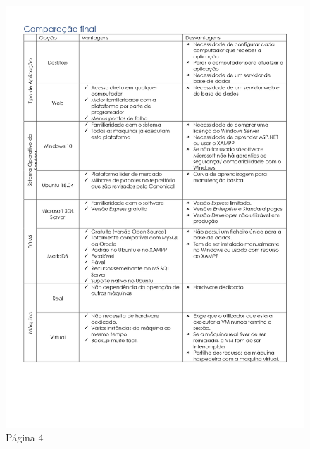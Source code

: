 \begin{figure}[H]
	\centering
	\includegraphics[width=\linewidth, frame]{figuras/Alternativas/pag4.jpg}
	\caption{Página 4}
	\label{fig:anexo_a_4}
\end{figure}
\newpage

